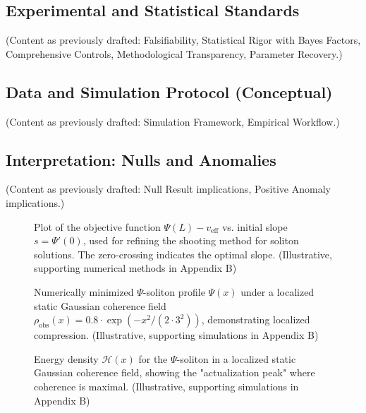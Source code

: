 \documentclass[11pt, a4paper]{book}
\begin{document}
\subsection{Experimental and Statistical Standards}
\label{ssec:empiricalpredictions_standards_mainpaper}
(Content as previously drafted: Falsifiability, Statistical Rigor with Bayes Factors, Comprehensive Controls, Methodological Transparency, Parameter Recovery.)

\subsection{Data and Simulation Protocol (Conceptual)}
\label{ssec:empiricalpredictions_datasim_mainpaper}
(Content as previously drafted: Simulation Framework, Empirical Workflow.)

\subsection{Interpretation: Nulls and Anomalies}
\label{ssec:empiricalpredictions_interpretation_mainpaper}
(Content as previously drafted: Null Result implications, Positive Anomaly implications.)

\begin{figure}[h!]
\centering
\caption{Plot of the objective function $\Psi(L) - v_{\text{eff}}$ vs. initial slope $s = \Psi'(0)$, used for refining the shooting method for soliton solutions. The zero-crossing indicates the optimal slope. (Illustrative, supporting numerical methods in Appendix B)}
\label{fig:objective_plot_mainpaper}
\end{figure}

\begin{figure}[h!]
\centering
\caption{Numerically minimized $\Psi$-soliton profile $\Psi(x)$ under a localized static Gaussian coherence field $\rho_{\text{obs}}(x) = 0.8 \cdot \exp(-x^2 / (2 \cdot 3^2))$, demonstrating localized compression. (Illustrative, supporting simulations in Appendix B)}
\label{fig:kink_gaussian_rho_static_mainpaper}
\end{figure}

\begin{figure}[h!]
\centering
\caption{Energy density $\mathcal{H}(x)$ for the $\Psi$-soliton in a localized static Gaussian coherence field, showing the "actualization peak" where coherence is maximal. (Illustrative, supporting simulations in Appendix B)}
\label{fig:energy_gaussian_rho_static_mainpaper}
\end{figure}
\end{document}
